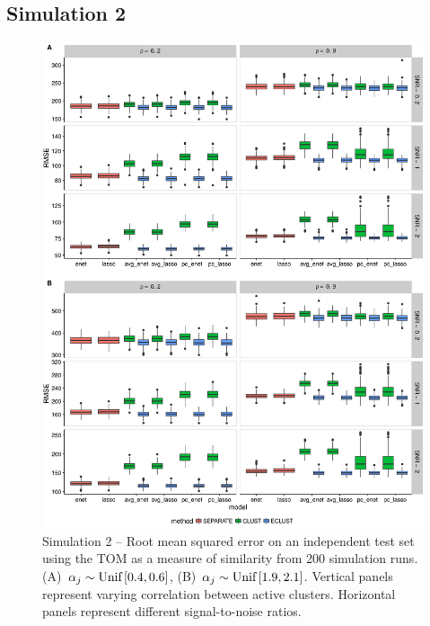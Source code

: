 \begin{appendices}
\subsection*{Simulation 2}
\begin{figure}[H]
	\centering
	\includegraphics[scale=0.55, keepaspectratio]{./figs/hydra/results/figures/sim2-sept8/RMSE_TOM_sim2.png}
	\caption{Simulation 2 -- Root mean squared error on an independent test set using the TOM as a measure of similarity from 200 simulation runs. \mbox{(A) $\alpha_{j} \sim \textrm{{Unif}}\left[0.4, 0.6\right]$}, \mbox{(B) $\alpha_{j} \sim \textrm{{Unif}}\left[1.9, 2.1\right]$}. Vertical panels represent varying correlation between active clusters. Horizontal panels represent different signal-to-noise ratios.}
	\label{fig:RMSE_TOM_sim2}
\end{figure}


\end{appendices}
